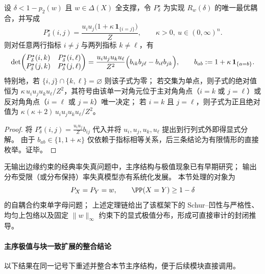 \begin{proposition}[最优耦合的二阶子式符号刚性]\label{prop:pom-diagonal-rate-optimal-coupling-minor-sign-rigidity}
设 \(\delta<1-p_2(w)\) 且 \(w\in\Delta(X)\) 全支撑，令 \(P^\star_\delta\) 为实现 \(R_w(\delta)\) 的唯一最优耦合，并写成
\[
P^\star_\delta(i,j)=\frac{u_i u_j\bigl(1+\kappa\,\mathbf 1_{\{i=j\}}\bigr)}{Z},
\qquad
\kappa>0,\ u\in(0,\infty)^n.
\]
则对任意两行指标 \(i\ne j\) 与两列指标 \(k\ne \ell\)，有
\[
\det\!\begin{pmatrix}
P^\star_\delta(i,k) & P^\star_\delta(i,\ell)\\
P^\star_\delta(j,k) & P^\star_\delta(j,\ell)
\end{pmatrix}
=\frac{u_i u_j u_k u_\ell}{Z^2}\Bigl(b_{ik}b_{j\ell}-b_{i\ell}b_{jk}\Bigr),
\qquad
b_{ab}:=1+\kappa\,\mathbf 1_{\{a=b\}}.
\]
特别地，若 \(\{i,j\}\cap\{k,\ell\}=\varnothing\) 则该子式为零；
若交集为单点，则子式的绝对值恒为 \(\kappa\,u_i u_j u_k u_\ell/Z^2\)，其符号由该单一对角元位于主对角角点（\(i=k\) 或 \(j=\ell\)）或反对角角点（\(i=\ell\) 或 \(j=k\)）唯一决定；
若 \(i=k\) 且 \(j=\ell\)，则子式为正且绝对值为 \(\kappa(\kappa+2)\,u_i u_j u_k u_\ell/Z^2\)。
\end{proposition}
\begin{proof}
将 \(P^\star_\delta(i,j)=\frac{u_i u_j}{Z}b_{ij}\) 代入并将 \(u_i,u_j,u_k,u_\ell\) 提出到行列式外即得显式分解。
由于 \(b_{ab}\in\{1,1+\kappa\}\) 仅依赖于指标相等关系，后三条结论为有限情形的直接枚举。证毕。
\end{proof}

\begin{remark}[文献边界说明]\label{rem:pom-diagonal-rate-literature-boundary-note}
无输出边缘约束的经典率失真问题中，主序结构与极值现象已有早期研究；
输出分布受限（或分布保持）率失真模型亦有系统化发展。
本节处理的对象为
\[
P_X=P_Y=w,\qquad \PP(X=Y)\ge 1-\delta
\]
的自耦合约束单字母问题；
上述定理链给出了该框架下的 Schur--凹性与严格性、均匀上包络以及固定 \(\|w\|_\infty\) 约束下的显式极值分布，形成可直接审计的封闭推导。
\end{remark}

\paragraph{主序极值与块一致扩展的整合结论}
以下结果在同一记号下重述并整合本节主序结构，便于后续模块直接调用。

